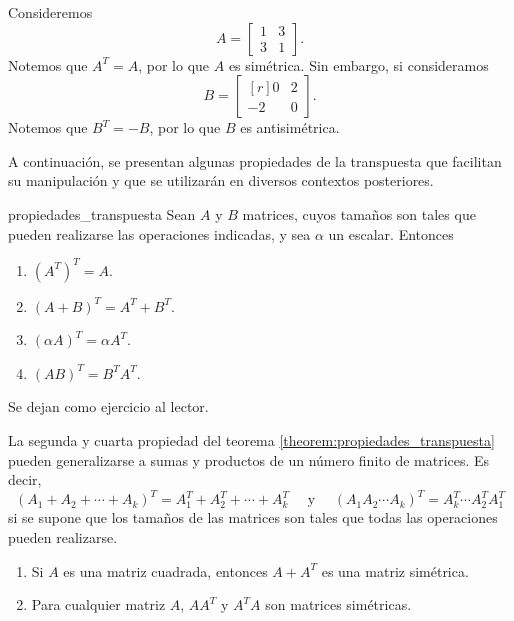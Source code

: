 \begin{examplebox}{}{}
    Consideremos
    $$A = \begin{bmatrix}
        1 & 3 \\
        3 & 1
    \end{bmatrix}.$$
    Notemos que $A^T = A$, por lo que $A$ es simétrica. Sin embargo, si consideramos
    $$B = \begin{bmatrix*}[r]
        0 & 2 \\
        -2 & 0
    \end{bmatrix*}.$$
    Notemos que $B^T = - B$, por lo que $B$ es antisimétrica.
\end{examplebox}

A continuación, se presentan algunas propiedades de la transpuesta que facilitan su manipulación y que se utilizarán en diversos contextos posteriores.

\newpage

\begin{theorem}{}{propiedades_transpuesta}
    Sean $A$ y $B$ matrices, cuyos tamaños son tales que pueden realizarse las operaciones indicadas, y sea $\alpha$ un escalar. Entonces
    \begin{enumerate}[label=\roman*), topsep=6pt, itemsep=0pt]
        \item $\left(A^T\right)^T = A$.
        \item $(A + B)^T = A^T + B^T$.
        \item $(\alpha A)^T = \alpha A^T$.
        \item $(AB)^T = B^TA^T$.
    \end{enumerate}

    \tcblower
    \demostracion Se dejan como ejercicio al lector.
\end{theorem}

La segunda y cuarta propiedad del teorema \ref{theorem:propiedades_transpuesta} pueden generalizarse a sumas y productos de un número finito de matrices. Es decir,
$$(A_1 + A_2 + \cdots + A_k)^T = A_1^T + A_2^T + \cdots + A_k^T \quad \text{ y } \quad (A_1 A_2 \cdots A_k)^T = A_k^T \cdots A_2^T A_1^T$$
si se supone que los tamaños de las matrices son tales que todas las operaciones pueden realizarse.

\begin{theorem}{}{}
    \begin{enumerate}[label=\alph*), topsep=6pt, itemsep=0pt]
        \item Si $A$ es una matriz cuadrada, entonces $A + A^T$ es una matriz simétrica.
        \item Para cualquier matriz $A$, $AA^T$ y $A^TA$ son matrices simétricas.
    \end{enumerate}
\end{theorem}

